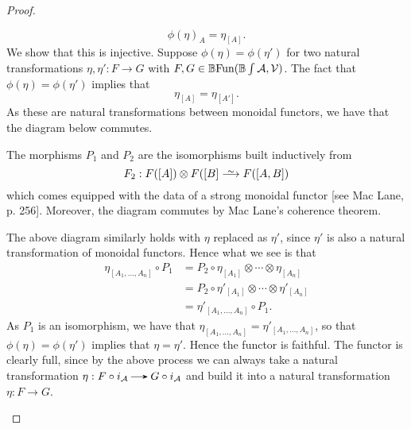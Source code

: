 \begin{proof}
\begin{description}
        \[
            \phi(\eta)_A = \eta_{[A]}.
        \]
        We show that this is injective. Suppose $\phi(\eta) = \phi(\eta')$ for two natural transformations $\eta, \eta': F \to G$ with $F, G \in \mathbb{B}\text{Fun}(\mathbb{B}\int\mathcal{A}, \mathcal{V})$.
        The fact that $\phi(\eta) = \phi(\eta')$ implies that 
        \[  
            \eta_{[A]} = \eta_{[A']}.
        \]
        As these are natural transformations between monoidal functors, we have that the diagram below commutes. 
        \begin{center}
        \end{center}
        The morphisms $P_1$ and $P_2$ are the isomorphisms built inductively from 
        \[
            F_2: F([A]) \otimes F([B] \isomarrow F([A, B])
        \]
        which comes equipped with the data of a strong monoidal functor [see Mac Lane, p. 256]. Moreover, the diagram commutes by Mac Lane's coherence theorem. 
        
        The above diagram similarly holds with $\eta$ replaced as $\eta'$, since $\eta'$ is also a natural transformation of monoidal functors. Hence what we see is that 
        \begin{align*}
            \eta_{[A_1, \dots, A_n]} \circ P_1
            &= 
            P_2 \circ \eta_{[A_1]}\otimes \cdots \otimes \eta_{[A_n]}\\
            &=
            P_2 \circ \eta'_{[A_1]}\otimes \cdots \otimes \eta'_{[A_n]}\\
            &=
            \eta'_{[A_1, \dots, A_n]} \circ P_1.
        \end{align*}
        As $P_1$ is an isomorphism, we have that $\eta_{[A_1, \dots, A_n]} = \eta'_{[A_1, \dots, A_n]}$, so that 
        $\phi(\eta) = \phi(\eta')$ implies that $\eta = \eta'$. Hence the functor is faithful. The functor is clearly full, since  by the above process we can always take a natural transformation $\eta: F\circ i_{\aa} \to G\circ i_{\aa}$ and build it into a natural transformation $\eta: F \to G$. 
        

\end{description}
\end{proof}
